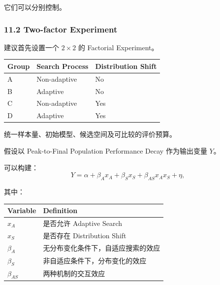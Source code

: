它们可以分别控制。

\hypertarget{part-4-77-0001-two-factor-experiment}{%
\subsubsection{11.2 Two-factor Experiment}\label{part-4-77-0001-two-factor-experiment}}

建议首先设置一个 \(2\times2\) 的 Factorial Experiment。

\begin{readertable}
\begin{longtable}[]{@{}
  >{\raggedright\arraybackslash}p{}
  >{\raggedright\arraybackslash}p{}
  >{\raggedright\arraybackslash}p{}@{}}
\toprule
Group & Search Process & Distribution Shift \\
\midrule
\endhead
A & Non-adaptive & No \\
B & Adaptive & No \\
C & Non-adaptive & Yes \\
D & Adaptive & Yes \\
\bottomrule
\end{longtable}
\end{readertable}

统一样本量、初始模型、候选空间及可比较的评价预算。

假设以 Peak-to-Final Population Performance Decay 作为输出变量 \(Y\)。

可以构建：
\[Y=
\alpha+\beta_Ax_A+\beta_Sx_S
+\beta_{AS}x_Ax_S+\eta,\]

其中：

\begin{readertable}
\begin{longtable}[]{@{}
  >{\raggedright\arraybackslash}p{}
  >{\raggedright\arraybackslash}p{}@{}}
\toprule
Variable & Definition \\
\midrule
\endhead
\(x_A\) & 是否允许 Adaptive Search \\
\(x_S\) & 是否存在 Distribution Shift \\
\(\beta_A\) & 无分布变化条件下，自适应搜索的效应 \\
\(\beta_S\) & 非自适应条件下，分布变化的效应 \\
\(\beta_{AS}\) & 两种机制的交互效应 \\
\bottomrule
\end{longtable}
\end{readertable}

